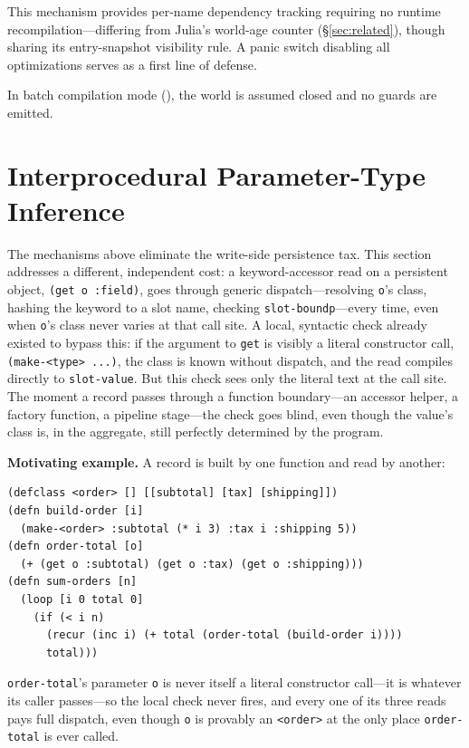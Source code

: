 \documentclass[sigplan,review,anonymous]{acmart}
\begin{document}
This mechanism provides per-name dependency tracking requiring no runtime recompilation---differing from Julia's world-age counter \cite{belyakova2020jit} (§\ref{sec:related}), though sharing its entry-snapshot visibility rule. A panic switch disabling all optimizations serves as a first line of defense.

In batch compilation mode (), the world is assumed closed and no guards are emitted.

\section{Interprocedural Parameter-Type Inference}
\label{sec:interprocedural}

The mechanisms above eliminate the write-side persistence tax. This section addresses a different, independent cost: a keyword-accessor read on a persistent object, \texttt{(get o :field)}, goes through generic dispatch---resolving \texttt{o}'s class, hashing the keyword to a slot name, checking \texttt{slot-boundp}---every time, even when \texttt{o}'s class never varies at that call site. A local, syntactic check already existed to bypass this: if the argument to \texttt{get} is visibly a literal constructor call, \texttt{(make-<type> ...)}, the class is known without dispatch, and the read compiles directly to \texttt{slot-value}. But this check sees only the literal text at the call site. The moment a record passes through a function boundary---an accessor helper, a factory function, a pipeline stage---the check goes blind, even though the value's class is, in the aggregate, still perfectly determined by the program.

\textbf{Motivating example.} A record is built by one function and read by another:
\begin{lstlisting}
(defclass <order> [] [[subtotal] [tax] [shipping]])
(defn build-order [i]
  (make-<order> :subtotal (* i 3) :tax i :shipping 5))
(defn order-total [o]
  (+ (get o :subtotal) (get o :tax) (get o :shipping)))
(defn sum-orders [n]
  (loop [i 0 total 0]
    (if (< i n)
      (recur (inc i) (+ total (order-total (build-order i))))
      total)))
\end{lstlisting}
\texttt{order-total}'s parameter \texttt{o} is never itself a literal constructor call---it is whatever its caller passes---so the local check never fires, and every one of its three reads pays full dispatch, even though \texttt{o} is provably an \texttt{<order>} at the only place \texttt{order-total} is ever called.
\end{document}
